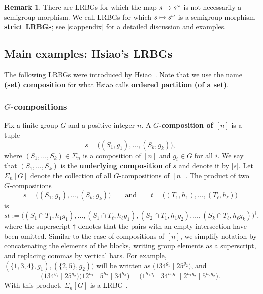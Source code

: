 \documentclass[11pt, oneside, reqno]{amsart}
\theoremstyle{definition}
\newtheorem{remark}[theorem]{Remark}
\numberwithin{equation}{section}
\newcommand{\defn}[1]{{\color{RoyalBlue}\bf#1}}
\def \gsetcomposition{{\Sigma_n[G]}}
\def \hsiao {{\gsetcomposition}}
\def\qqand{\qquad\text{and}\qquad}
\newcommand{\abs}[1]{|{#1}|} 				%
\begin{document}
\begin{remark}
    There are LRBGs for which the map $s \xmapsto{} s^\omega$
    is not necessarily a semigroup morphism.
    We call LRBGs for which $s \xmapsto{} s^\omega$
    is a semigroup morphism \defn{strict LRBGs}; see \cref{s:appendix} for
    a detailed discussion and examples.
\end{remark}

\subsection{Main examples: Hsiao's LRBGs}\label{ss:Hsiao's}
The following LRBGs were introduced by Hsiao~\cite{hsiao2007semigroup}.
Note that we use the name \defn{(set) composition} for what Hsiao calls \defn{ordered partition (of a set)}.

\subsubsection{$G$-compositions}

Fix a finite group $G$ and a positive integer $n$.
A \defn{$G$-composition of $[n]$} is a tuple
\begin{equation*}
    s = \big( (S_1,g_1),\dots,(S_k,g_k) \big),
\end{equation*}
where $(S_1,\dots,S_k) \in \Sigma_n$ is a composition of $[n]$ and $g_i \in G$ for all $i$.
We say that $(S_1,\dots,S_k)$ is the \defn{underlying composition} of $s$ and denote it by $\abs{s}$. 
Let $\hsiao$ denote the collection of all $G$-compositions of $[n]$.
The product of two $G$-compositions
\[   s = \big( (S_1,g_1),\dots,(S_k,g_k) \big) \qqand t = \big( (T_1,h_1),\dots,(T_\ell,h_\ell) \big)    \]
is
\[
    st := \big(
        (S_1 \cap T_1 , h_1 g_1),\dots,(S_1 \cap T_\ell, h_\ell g_1),
        (S_2 \cap T_1 , h_1 g_2),
        \dots,
        (S_k \cap T_\ell , h_\ell g_k)
    \big)^\dagger,
\]
where the superscript $\dagger$ denotes that the pairs with an empty intersection have been omitted.
Similar to the case of compositions of $[n]$, we simplify notation by concatenating the elements of the blocks, writing group elements as a superscript, and replacing commas by vertical bars.
For example, $( \{1,3,4\} , g_1) , ( \{2,5\}, g_2) \big) $ will be written as $\big(134^{g_1} \mid 25^{g_2}\big)$, and
\[
    \big(134^{g_1} \mid 25^{g_2} \big)  \big( 12^{h_1} \mid 5^{h_2} \mid 34^{h_3} \big) = \big( 1^{h_1 g_1} \mid 34^{h_3 g_1} \mid 2^{h_1 g_2} \mid 5^{h_2 g_2}  \big).
\]
With this product, $\hsiao$ is a LRBG \cite{hsiao2007semigroup}.
\end{document}
